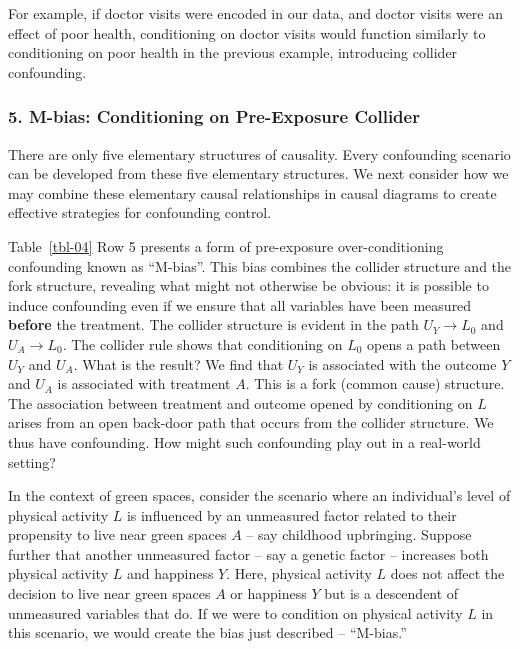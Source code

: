\documentclass[
  singlecolumn]{article}
\begin{document}
For example, if doctor visits were encoded in our data, and doctor
visits were an effect of poor health, conditioning on doctor visits
would function similarly to conditioning on poor health in the previous
example, introducing collider confounding.

\subsubsection{5. M-bias: Conditioning on Pre-Exposure
Collider}\label{m-bias-conditioning-on-pre-exposure-collider}

There are only five elementary structures of causality. Every
confounding scenario can be developed from these five elementary
structures. We next consider how we may combine these elementary causal
relationships in causal diagrams to create effective strategies for
confounding control.

Table~\ref{tbl-04} Row 5 presents a form of pre-exposure
over-conditioning confounding known as ``M-bias''. This bias combines
the collider structure and the fork structure, revealing what might not
otherwise be obvious: it is possible to induce confounding even if we
ensure that all variables have been measured \textbf{before} the
treatment. The collider structure is evident in the path \(U_Y \to L_0\)
and \(U_A \to L_0\). The collider rule shows that conditioning on
\(L_0\) opens a path between \(U_Y\) and \(U_A\). What is the result? We
find that \(U_Y\) is associated with the outcome \(Y\) and \(U_A\) is
associated with treatment \(A\). This is a fork (common cause)
structure. The association between treatment and outcome opened by
conditioning on \(L\) arises from an open back-door path that occurs
from the collider structure. We thus have confounding. How might such
confounding play out in a real-world setting?

In the context of green spaces, consider the scenario where an
individual's level of physical activity \(L\) is influenced by an
unmeasured factor related to their propensity to live near green spaces
\(A\) -- say childhood upbringing. Suppose further that another
unmeasured factor -- say a genetic factor -- increases both physical
activity \(L\) and happiness \(Y\). Here, physical activity \(L\) does
not affect the decision to live near green spaces \(A\) or happiness
\(Y\) but is a descendent of unmeasured variables that do. If we were to
condition on physical activity \(L\) in this scenario, we would create
the bias just described -- ``M-bias.''
\end{document}
